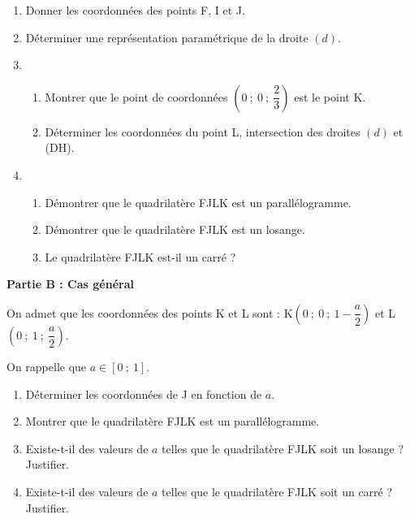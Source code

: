 \begin{enumerate}
\item Donner les coordonnées des points F{}, I et J.
\item Déterminer une représentation paramétrique de la droite $(d)$.
\item 
	\begin{enumerate}
		\item Montrer que le point de coordonnées $\left(0~;~ 0~;~\dfrac{2}{3}\right)$ est le point K.
		\item Déterminer les coordonnées du point L, intersection des droites $(d)$ et (DH).

	\end{enumerate}
\item  
	\begin{enumerate}
		\item Démontrer que le quadrilatère FJLK est un parallélogramme. 
		\item Démontrer que le quadrilatère FJLK est un losange.
		\item Le quadrilatère FJLK est-il un carré ?

	\end{enumerate}
\end{enumerate}

\bigskip

\textbf{Partie B : Cas général}

\medskip

On admet que les coordonnées des points K et L sont : K$\left(0~;~0~;~1- \dfrac{a}{2}\right)$ et L$\left(0~;~1~;~\dfrac{a}{2}\right)$.

On rappelle que $a \in [0~;~1]$.

\medskip

\begin{enumerate}
\item Déterminer les coordonnées de J en fonction de $a$.
\item Montrer que le quadrilatère FJLK est un parallélogramme.
\item Existe-t-il des valeurs de $a$ telles que le quadrilatère FJLK soit un losange ? Justifier.
\item Existe-t-il des valeurs de $a$ telles que le quadrilatère FJLK soit un carré ? Justifier.
\end{enumerate}

\bigskip

